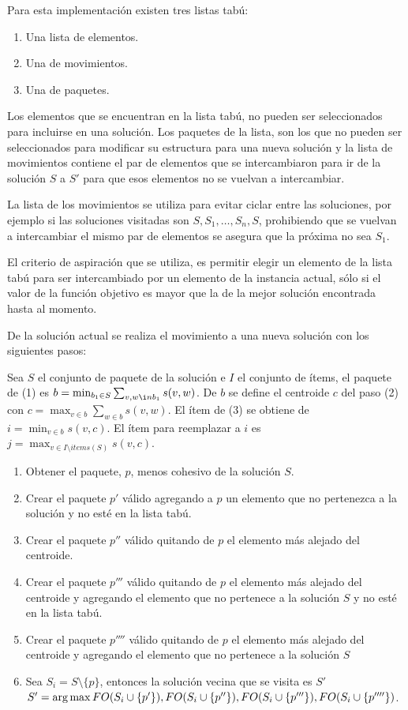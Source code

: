 Para esta implementación existen tres listas tabú: 
\begin{enumerate}
	\item Una lista de elementos.
	\item Una de movimientos.
	\item Una de paquetes.
\end{enumerate}

Los elementos que se encuentran en la lista tabú, no pueden ser seleccionados para incluirse en una solución. Los paquetes de la lista, son los que no pueden ser seleccionados para modificar su estructura para una nueva solución y la lista de movimientos contiene el par de elementos que se intercambiaron para ir de la solución $S$ a $S'$ para que esos elementos no se vuelvan a intercambiar.

La lista de los movimientos se utiliza para evitar ciclar entre las soluciones, por ejemplo si las soluciones visitadas son $S, S_1, \ldots, S_n, S$, prohibiendo que se vuelvan a intercambiar el mismo par de elementos se asegura que la próxima no sea $S_1$.

El criterio de aspiración que se utiliza, es permitir elegir un elemento de la lista tabú para ser intercambiado por un elemento de la instancia actual, sólo si el valor de la función objetivo es mayor que la de la mejor solución encontrada hasta al momento.

De la solución actual se realiza el movimiento a una nueva solución con los siguientes pasos:

Sea $S$ el conjunto de paquete de la solución e $I$ el conjunto de ítems, el paquete de (1) es $b = \min_{b_1 \in S}{\sum_{v,w \i
n b_1}{s(v,w)}}$. De $b$ se define el centroide $c$ del paso (2) con $c = \max_{v \in b}{\sum_{w \in b}{s(v,w)}}$. El ítem de (3) se obtiene de $i = \min_{v \in b}{s(v,c)}$. El ítem para reemplazar a $i$ es $j = \max_{v \in I \setminus items(S)}{s(v,c)}$.

\begin{enumerate}
	\item Obtener el paquete, $p$, menos cohesivo de la solución $S$.
	\item Crear el paquete $p'$ válido agregando a $p$ un elemento que no pertenezca a la solución y no esté en la lista tabú.
	\item Crear el paquete $p''$ válido quitando de $p$ el elemento más alejado del centroide.
	\item Crear el paquete $p'''$ válido quitando de $p$ el elemento más alejado del centroide y agregando el elemento que no pertenece a la solución $S$ y no esté en la lista tabú.
	\item Crear el paquete $p''''$ válido quitando de $p$ el elemento más alejado del centroide y agregando el elemento que no pertenece a la solución $S$
	\item Sea $S_{i} = S\setminus \{p\}$, entonces la solución vecina que se visita es $S'$\\
	$S' = \operatorname*{arg\,max} {FO(S_{i}\cup\{p'\}), FO(S_{i}\cup\{p''\}), FO(S_{i}\cup\{p'''\}), FO(S_{i}\cup\{p''''\})}$.
\end{enumerate}

